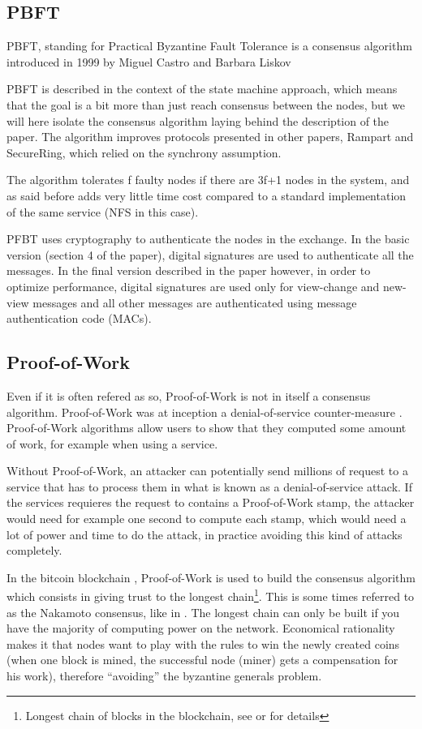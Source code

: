 \documentclass[11pt, twocolumn]{article}
\begin{document}
\subsection{PBFT}

PBFT, standing for Practical Byzantine Fault Tolerance is a consensus algorithm introduced in 1999 by Miguel Castro and Barbara Liskov \cite{pbft}

PBFT is described in the context of the state machine approach, which means that the goal is a bit more than just reach consensus between the nodes, but we will here isolate the consensus algorithm laying behind the description of the paper. The algorithm improves protocols presented in other papers, Rampart and SecureRing, which relied on the synchrony assumption.

The algorithm tolerates f faulty nodes if there are 3f+1 nodes in the system, and as said before adds very little time cost compared to a standard implementation of the same service (NFS in this case).

PFBT uses cryptography to authenticate the nodes in the exchange. In the basic version (section 4 of the paper), digital signatures are used to authenticate all the messages. In the final version described in the paper however, in order to optimize performance, digital signatures are used only for view-change and new-view messages and all other messages are authenticated using message authentication code (MACs).

\subsection{Proof-of-Work}
\label{sec:pow}

Even if it is often refered as so, Proof-of-Work is not in itself a consensus algorithm. Proof-of-Work was at inception a denial-of-service counter-measure \cite{hashcash}. Proof-of-Work algorithms allow users to show that they computed some amount of work, for example when using a service.

Without Proof-of-Work, an attacker can potentially send millions of request to a service that has to process them in what is known as a denial-of-service attack. If the services requieres the request to contains a Proof-of-Work stamp, the attacker would need for example one second to compute each stamp, which would need a lot of power and time to do the attack, in practice avoiding this kind of attacks completely.

In the bitcoin blockchain \cite{bitcoin}, Proof-of-Work is used to build the consensus algorithm which consists in giving trust to the longest chain\footnote{Longest chain of blocks in the blockchain, see \cite{blockchain} or \cite{bitcoin} for details}. This is some times referred to as the Nakamoto consensus, like in \cite{proconsensus}. The longest chain can only be built if you have the majority of computing power on the network. 
Economical rationality makes it that nodes want to play with the rules to win the newly created coins (when one block is mined, the successful node (miner) gets a compensation for his work), therefore “avoiding” the byzantine generals problem.
\end{document}
